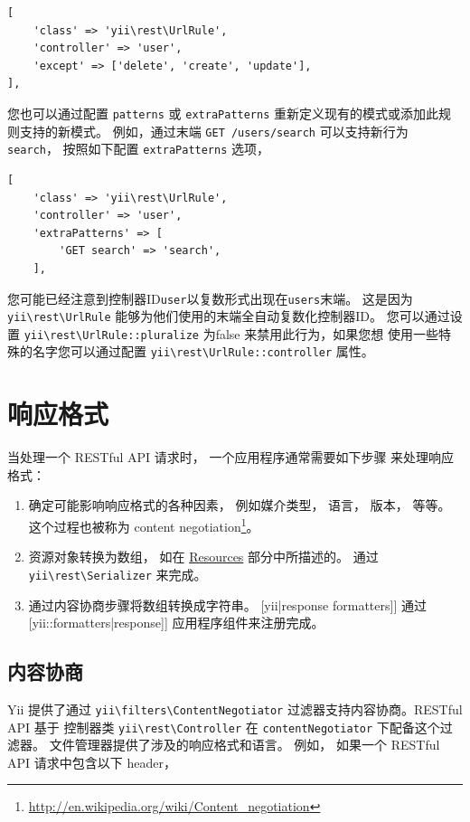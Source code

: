\lstset{language=php}\begin{lstlisting}
[
    'class' => 'yii\rest\UrlRule',
    'controller' => 'user',
    'except' => ['delete', 'create', 'update'],
],
\end{lstlisting}
您也可以通过配置 \lstinline|patterns| 或 \lstinline|extraPatterns| 重新定义现有的模式或添加此规则支持的新模式。
例如，通过末端 \lstinline|GET /users/search| 可以支持新行为 \lstinline|search|， 按照如下配置 \lstinline|extraPatterns| 选项，

\lstset{language=php}\begin{lstlisting}
[
    'class' => 'yii\rest\UrlRule',
    'controller' => 'user',
    'extraPatterns' => [
        'GET search' => 'search',
    ],
\end{lstlisting}
您可能已经注意到控制器ID\lstinline|user|以复数形式出现在\lstinline|users|末端。
这是因为 \texttt{yii{\allowbreak{}\textbackslash}rest{\allowbreak{}\textbackslash}UrlRule} 能够为他们使用的末端全自动复数化控制器ID。
您可以通过设置 \texttt{yii{\allowbreak{}\textbackslash}rest{\allowbreak{}\textbackslash}UrlRule\allowbreak{}::\allowbreak{}pluralize} 为false 来禁用此行为，如果您想
使用一些特殊的名字您可以通过配置 \texttt{yii{\allowbreak{}\textbackslash}rest{\allowbreak{}\textbackslash}UrlRule\allowbreak{}::\allowbreak{}controller} 属性。



\label{rest-response-formatting.md}\section{响应格式}
当处理一个 RESTful API 请求时， 一个应用程序通常需要如下步骤
来处理响应格式：

\begin{enumerate}
\item 确定可能影响响应格式的各种因素， 例如媒介类型， 语言， 版本， 等等。
这个过程也被称为 content negotiation\footnote{\url{http://en.wikipedia.org/wiki/Content\_negotiation}}。
\item 资源对象转换为数组， 如在 \hyperref[rest-resources.md]{Resources} 部分中所描述的。
通过 \texttt{yii{\allowbreak{}\textbackslash}rest{\allowbreak{}\textbackslash}Serializer} 来完成。
\item 通过内容协商步骤将数组转换成字符串。
[yii\web\ResponseFormatterInterface|response formatters]] 通过
[yii\web\Response::formatters|response]] 应用程序组件来注册完成。
\end{enumerate}
\subsection{内容协商 \label{rest-response-formatting.md::content-negotiation}}
Yii 提供了通过 \texttt{yii{\allowbreak{}\textbackslash}filters{\allowbreak{}\textbackslash}ContentNegotiator} 过滤器支持内容协商。RESTful API 基于
控制器类 \texttt{yii{\allowbreak{}\textbackslash}rest{\allowbreak{}\textbackslash}Controller} 在 \lstinline|contentNegotiator| 下配备这个过滤器。
文件管理器提供了涉及的响应格式和语言。 例如， 如果一个 RESTful
API 请求中包含以下 header，

